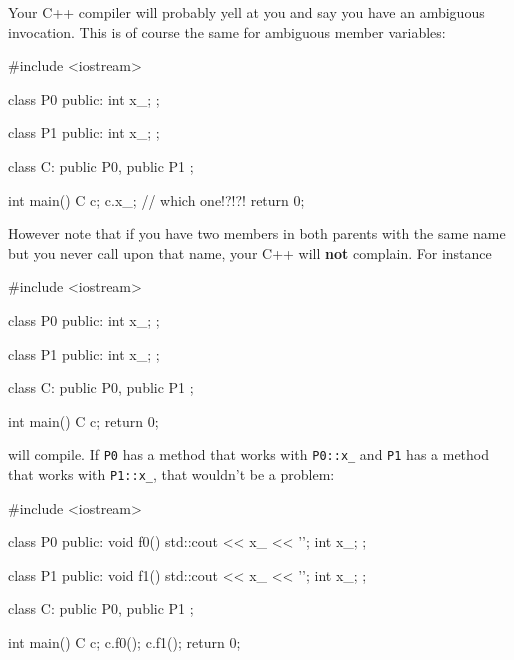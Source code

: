 Your C++ compiler will probably yell at you and say you have an
ambiguous invocation. This is of course the same for ambiguous member
variables:
\begin{console}
#include <iostream>

class P0
{
public:
        int x_;
};

class P1
{
public:
        int x_;
};

class C: public P0, public P1
{};

int main()
{   
    C c;
    c.x_; // which one!?!?!
    return 0;
}
\end{console}

However note that if you have two members in both parents with the same
name but you never call upon that name, your C++ will \textbf{not}
complain. For instance
\begin{console}
#include <iostream>

class P0
{
public:
        int x_;
};

class P1
{
public:
        int x_;
};

class C: public P0, public P1
{};

int main()
{   
    C c;
    return 0;
}
\end{console}

will compile. If \verb!P0! has a method that works with \verb!P0::x_! and \verb!P1! has a method that works with \verb!P1::x_!, that wouldn't be a problem:
\begin{console}
#include <iostream>

class P0
{
public:
        void f0() { std::cout << x_ << '\n'; }
        int x_;
};

class P1
{
public:
        void f1() { std::cout << x_ << '\n'; }
        int x_;
};

class C: public P0, public P1
{};

int main()
{   
    C c;
    c.f0();
    c.f1();
    return 0;
}
\end{console}

